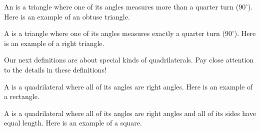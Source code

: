 \documentclass{ximera}
\begin{document}
\begin{definition}
	An  is a triangle where one of its angles measures more than a quarter turn ($90^{\circ}$). Here is an example of an obtuse triangle.
	\begin{center}
	\end{center}
\end{definition}

\begin{definition}
	A  is a triangle where one of its angles measures exactly a quarter turn ($90^{\circ}$). Here is an example of a right triangle.
	\begin{center}
	\end{center}
\end{definition}

Our next definitions are about special kinds of quadrilaterals. Pay close attention to the details in these definitions!

\begin{definition}
	A  is a quadrilateral where all of its angles are right angles. Here is an example of a rectangle.
	\begin{center}
	\end{center}
\end{definition}


\begin{definition}
	A  is a quadrilateral where all of its angles are right angles and all of its sides have equal length. Here is an example of a square.
	\begin{center}
	\end{center}
\end{definition}
\end{document}

